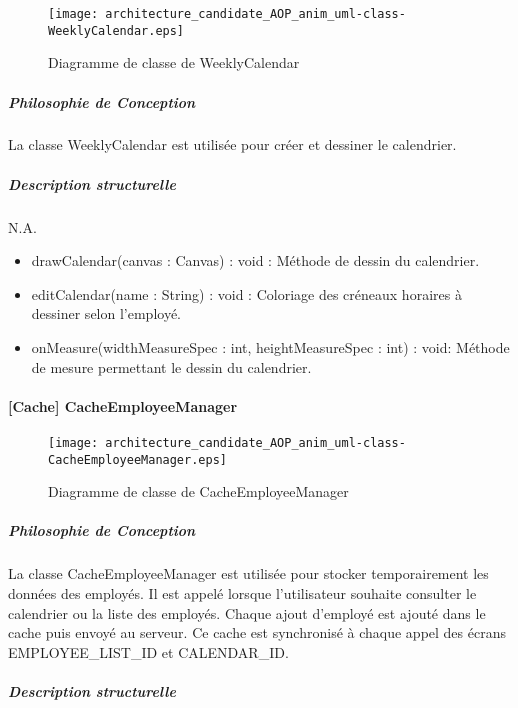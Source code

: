     \begin{figure} [H]
        \centering
        \texttt{[image: architecture\_candidate\_AOP\_anim\_uml-class-WeeklyCalendar.eps]}
        \caption{Diagramme de classe de WeeklyCalendar}
        \label{Classe-WeeklyCalendar}
    \end{figure}

        \subparagraph{Philosophie de Conception}%
        La classe WeeklyCalendar est utilisée pour créer et dessiner le calendrier.
        \subparagraph{Description structurelle}%
        
            N.A.
            \begin{itemize}
                \item {drawCalendar(canvas : Canvas) : void : Méthode de dessin du calendrier.}
                \item {editCalendar(name : String) : void : Coloriage des créneaux horaires à dessiner selon l'employé.}
                \item {onMeasure(widthMeasureSpec : int, heightMeasureSpec : int) : void: Méthode de mesure permettant le dessin du calendrier.}
            \end{itemize}

\newpage 

    \paragraph{[Cache] CacheEmployeeManager}%

    \begin{figure} [H]
        \centering
        \texttt{[image: architecture\_candidate\_AOP\_anim\_uml-class-CacheEmployeeManager.eps]}
        \caption{Diagramme de classe de CacheEmployeeManager}
        \label{Classe-CacheEmployeeManager}
    \end{figure}

            \subparagraph{Philosophie de Conception}%
            La classe CacheEmployeeManager est utilisée pour stocker temporairement les données des employés.
            Il est appelé lorsque l'utilisateur souhaite consulter le calendrier ou la liste des employés.
            Chaque ajout d'employé est ajouté dans le cache puis envoyé au serveur.
            Ce cache est synchronisé à chaque appel des écrans EMPLOYEE\_LIST\_ID et CALENDAR\_ID.
            \subparagraph{Description structurelle}%
            
